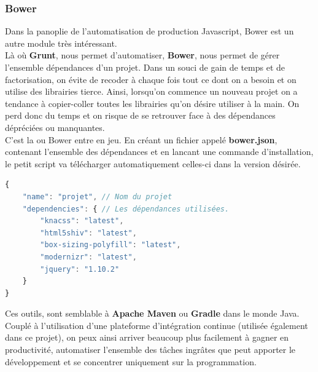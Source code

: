 \documentclass{report}
\newcommand{\jumpOne}{\\[1\baselineskip]}
\begin{document}
\subsubsection{Bower}
Dans la panoplie de l'automatisation de production Javascript, Bower est un autre module très intéressant. 
\jumpOne
Là où \textbf{Grunt}, nous permet d'automatiser, \textbf{Bower}, nous permet de gérer l'ensemble dépendances d'un projet.
Dans un souci de gain de temps et de factorisation, on évite de recoder à chaque fois tout ce dont on a besoin et on utilise des librairies tierce. 
Ainsi, lorsqu'on commence un nouveau projet on a tendance à copier-coller toutes les librairies qu'on désire utiliser à la main. 
On perd donc du temps et on risque de se retrouver face à des dépendances dépréciées ou manquantes. 
\jumpOne
C'est la ou Bower entre en jeu. 
En créant un fichier appelé \textbf{bower.json}, contenant l'ensemble des dépendances et en lancant une commande d'installation, le petit script va télécharger automatiquement celles-ci dans la version désirée. 
\begin{lstlisting}[language=javascript, caption=Exempe-type de fichier JSON]
{
    "name": "projet", // Nom du projet
    "dependencies": { // Les dépendances utilisées.
        "knacss": "latest",
        "html5shiv": "latest",
        "box-sizing-polyfill": "latest",
        "modernizr": "latest",
        "jquery": "1.10.2"
    }
}	
\end{lstlisting}
Ces outils, sont semblable à \textbf{Apache Maven} ou \textbf{Gradle} dans le monde Java. 
\jumpOne
Couplé à l'utilisation d'une plateforme d'intégration continue (utilisée également dans ce projet), on peux ainsi arriver beaucoup plus facilement à gagner en productivité, automatiser l'ensemble des tâches ingrâtes que peut apporter le développement et se concentrer uniquement sur la programmation. 
\end{document}
